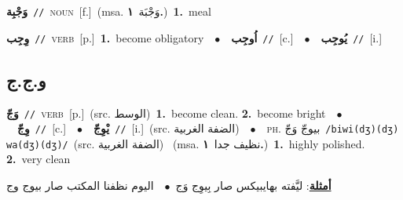 \documentclass[10pt,a4paper,twoside]{article} %
\begin{document}
\begin{multicols}{2}
{\setlength\topsep{0pt}\textbf{\foreignlanguage{arabic}{وَجْبِة}}\ {\color{gray}\texttt{//}\color{black}}\ \textsc{noun}\ [f.]\ \color{gray}(msa. \foreignlanguage{arabic}{وَجْبَة}~\foreignlanguage{arabic}{\textbf{١.}})\color{black}\ \textbf{1.}~meal\ } \vspace{2mm}

{\setlength\topsep{0pt}\textbf{\foreignlanguage{arabic}{وِجِب}}\ {\color{gray}\texttt{//}\color{black}}\ \textsc{verb}\ [p.]\ \textbf{1.}~become obligatory\ \ $\bullet$\ \ \setlength\topsep{0pt}\textbf{\foreignlanguage{arabic}{اُوجِب}}\ {\color{gray}\texttt{//}\color{black}}\ [c.]\ \ $\bullet$\ \ \setlength\topsep{0pt}\textbf{\foreignlanguage{arabic}{يُوجِب}}\ {\color{gray}\texttt{//}\color{black}}\ [i.]\ } \vspace{2mm}

\vspace{-3mm}
\subsection*{\color{blue}\foreignlanguage{arabic}{و.ج.ج}\color{blue}{}} 

{\setlength\topsep{0pt}\textbf{\foreignlanguage{arabic}{وَجّ}}\ {\color{gray}\texttt{//}\color{black}}\ \textsc{verb}\ [p.]\ (src. \color{gray}\foreignlanguage{arabic}{الوسط}\color{black})\ \textbf{1.}~become clean.  \textbf{2.}~become bright\ \ $\bullet$\ \ \setlength\topsep{0pt}\textbf{\foreignlanguage{arabic}{وِجّ}}\ {\color{gray}\texttt{//}\color{black}}\ [c.]\ \ $\bullet$\ \ \setlength\topsep{0pt}\textbf{\foreignlanguage{arabic}{يْوِجّ}}\ {\color{gray}\texttt{//}\color{black}}\ [i.]\ (src. \color{gray}\foreignlanguage{arabic}{الضفة الغربية}\color{black})\ \ $\bullet$\ \ \textsc{ph.} \color{gray} \foreignlanguage{arabic}{بيوجّ وَجّ}\color{black}\ {\color{gray}\texttt{/{\sffamily biwi(dʒ)(dʒ) wa(dʒ)(dʒ)}/}\color{black}}\ \color{gray}(src. \foreignlanguage{arabic}{الضفة الغربية})\color{black}\ \color{gray} (msa. \foreignlanguage{arabic}{نظيف جدا}~\foreignlanguage{arabic}{\textbf{١.}})\color{black}\ \textbf{1.}~highly polished.  \textbf{2.}~very clean\  \begin{flushright}\color{gray}\foreignlanguage{arabic}{\textbf{\underline{\foreignlanguage{arabic}{أمثلة}}}: ليَّفته بهايبيكس صار بِيوِج وَج\ $\bullet$\ \  اليوم نظفنا المكتب صار بيوج وج}\end{flushright}\color{black}} \vspace{2mm}


\end{multicols}
\end{document}
